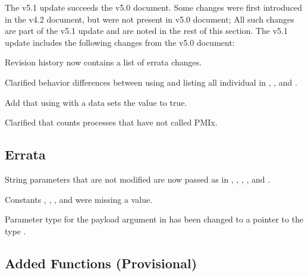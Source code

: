 The v5.1 update succeeds the v5.0 document.
Some changes were first introduced in the v4.2 document, but were not present in v5.0 document;
All such changes are part of the v5.1 update and are noted in the rest of this section.
The v5.1 update includes the following changes from the v5.0 document:

\begin{compactitemize}
  \item Revision history now contains a list of errata changes.
  \item Clarified behavior differences between using  and listing all individual  in , , and .
  \item Add that using  with a   data sets the value to true.
  \item Clarified that  counts processes that have not called PMIx.
\end{compactitemize}

\subsection{Errata}

\begin{compactitemize}
  \item String parameters that are not modified are now passed as  in , , , , and .
  \item Constants , , , and  were missing a value.
  \item Parameter type for the payload argument in  has been changed to a pointer to the type .

\end{compactitemize}

\subsection{Added Functions (Provisional)}


